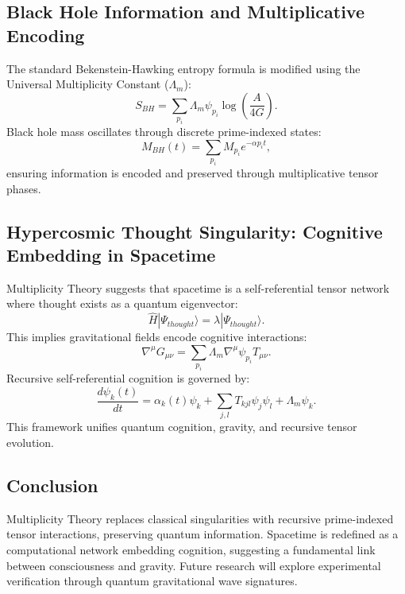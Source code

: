 \documentclass[12]{amsart}
\theoremstyle{plain}
\begin{document}
\subsection{Black Hole Information and Multiplicative Encoding}
The standard Bekenstein-Hawking entropy formula is modified using the Universal Multiplicity Constant ($\Lambda_m$):
\begin{equation}
S_{BH} = \sum_{p_i} \Lambda_m \psi_{p_i} \log \left( \frac{A}{4G} \right).
\end{equation}
Black hole mass oscillates through discrete prime-indexed states:
\begin{equation}
M_{BH}(t) = \sum_{p_i} M_{p_i} e^{-\alpha p_i t},
\end{equation}
ensuring information is encoded and preserved through multiplicative tensor phases.

\subsection{Hypercosmic Thought Singularity: Cognitive Embedding in Spacetime}
Multiplicity Theory suggests that spacetime is a self-referential tensor network where thought exists as a quantum eigenvector:
\begin{equation}
\hat{H} | \Psi_{thought} \rangle = \lambda | \Psi_{thought} \rangle.
\end{equation}
This implies gravitational fields encode cognitive interactions:
\begin{equation}
\nabla^\mu G_{\mu\nu} = \sum_{p_i} \Lambda_m \nabla^\mu \psi_{p_i} T_{\mu\nu}.
\end{equation}
Recursive self-referential cognition is governed by:
\begin{equation}
\frac{d\psi_k(t)}{dt} = \alpha_k(t) \psi_k + \sum_{j,l} T_{kjl} \psi_j \psi_l + \Lambda_m \psi_k.
\end{equation}
This framework unifies quantum cognition, gravity, and recursive tensor evolution.

\subsection{Conclusion}
Multiplicity Theory replaces classical singularities with recursive prime-indexed tensor interactions, preserving quantum information. Spacetime is redefined as a computational network embedding cognition, suggesting a fundamental link between consciousness and gravity. Future research will explore experimental verification through quantum gravitational wave signatures.
\end{document}
